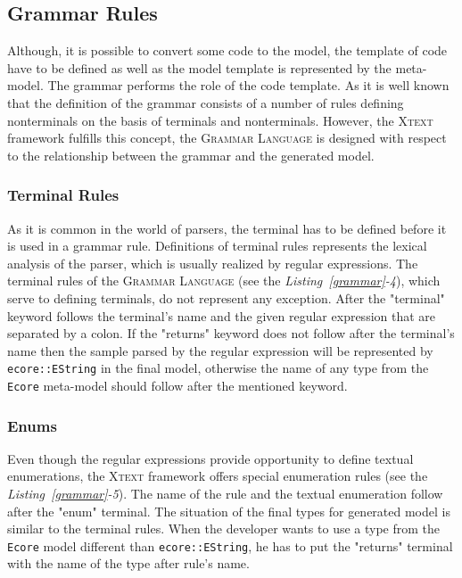 \documentclass[12pt,notitlepage,a4paper]{report}
\begin{document}
\subsection{Grammar Rules}
Although, it is possible to convert some code to the model, the template of code have to be defined as well as the model template is represented by the meta-model. The grammar performs the role of the code template. As it is well known that the definition of the grammar consists of a number of rules defining nonterminals on the basis of terminals and nonterminals. However, the \textsc{Xtext} framework fulfills this concept, the \textsc{Grammar Language} is designed with respect to the relationship between the grammar and the generated model. 

\subsubsection{Terminal Rules}\label{TerminalRules}
As it is common in the world of parsers, the terminal has to be defined before it is used in a grammar rule. Definitions of terminal rules represents the lexical analysis of the parser, which is usually realized by regular expressions. The terminal rules of the \textsc{Grammar Language} (see the \textit{Listing~\ref{grammar}-4}), which serve to defining terminals, do not represent any exception. After the "terminal" keyword follows the terminal's name and the given regular expression that are separated by a colon. If the "returns" keyword does not follow after the terminal's name then the sample parsed by the regular expression will be represented by \texttt{ecore::EString} in the final model, otherwise the name of any type from the \texttt{Ecore} meta-model should follow after the mentioned keyword.

\subsubsection{Enums}
Even though the regular expressions provide opportunity to define textual enumerations, the \textsc{Xtext} framework offers special enumeration rules (see the \textit{Listing~\ref{grammar}-5}). The name of the rule and the textual enumeration follow after the "enum" terminal. The situation of the final types for generated model is similar to the terminal rules. When the developer wants to use a type from the \texttt{Ecore} model different than \texttt{ecore::EString}, he has to put the "returns" terminal with the name of the type after rule's name.
\end{document}
